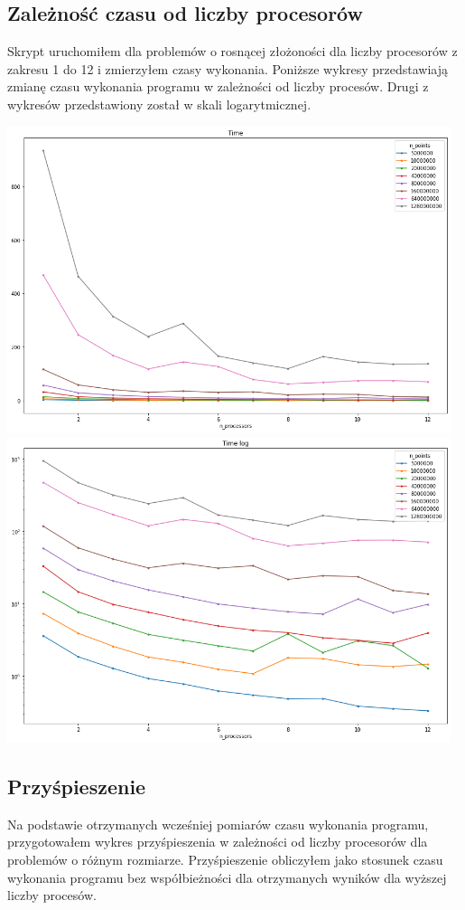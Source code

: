 \documentclass{article}
\begin{document}
        \subsection{Zależność czasu od liczby procesorów}
        Skrypt uruchomiłem dla problemów o rosnącej złożoności dla liczby procesorów z zakresu 1 do 12 i zmierzyłem czasy wykonania. Poniższe wykresy przedstawiają zmianę czasu wykonania programu w zależności od liczby procesów. Drugi z wykresów przedstawiony został w skali logarytmicznej.  
        \begin{center}
            \includegraphics[width=13cm]{report1/images/ex2_vcl_time.png}
            \includegraphics[width=13cm]{report1/images/ex2_vcl_time_log.png}
        \end{center}
        
        \subsection{Przyśpieszenie}
        Na podstawie otrzymanych wcześniej pomiarów czasu wykonania programu, przygotowałem wykres przyśpieszenia w zależności od liczby procesorów dla problemów o różnym rozmiarze. Przyśpieszenie obliczyłem jako stosunek czasu wykonania programu bez współbieżności dla otrzymanych wyników dla wyższej liczby procesów. 
        
\end{document}
